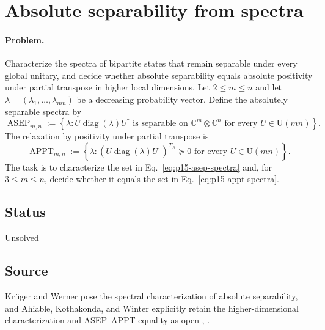 \section{Absolute separability from spectra}
\label{sec:op_b063bdae4363cda8}

\paragraph{Problem.}
Characterize the spectra of bipartite states that remain separable under every
global unitary, and decide whether absolute separability equals absolute
positivity under partial transpose in higher local dimensions.  Let
$2\le m\le n$ and let
$\lambda=(\lambda_1,\ldots,\lambda_{mn})$ be a decreasing probability vector.
Define the absolutely separable spectra by
\begin{equation}
  \operatorname{ASEP}_{m,n}
  :=\left\{
    \lambda:
    U\operatorname{diag}(\lambda)U^\dagger
    \text{ is separable on }\mathbb{C}^m\otimes\mathbb{C}^n
    \text{ for every }U\in\mathrm{U}(mn)
  \right\}.
  \label{eq:p15-asep-spectra}
\end{equation}
The relaxation by positivity under partial transpose is
\begin{equation}
  \operatorname{APPT}_{m,n}
  :=\left\{
    \lambda:
    \left(U\operatorname{diag}(\lambda)U^\dagger\right)^{T_B}\succeq0
    \text{ for every }U\in\mathrm{U}(mn)
  \right\}.
  \label{eq:p15-appt-spectra}
\end{equation}
The task is to characterize the set in Eq.~\eqref{eq:p15-asep-spectra} and,
for $3\le m\le n$, decide whether it equals the set in
Eq.~\eqref{eq:p15-appt-spectra}.

\subsection*{Status}

Unsolved

\subsection*{Source}

Kr\"uger and Werner pose the spectral characterization of absolute
separability, and Ahiable, Kothakonda, and Winter explicitly retain the
higher-dimensional characterization and ASEP--APPT equality as open
,
.

